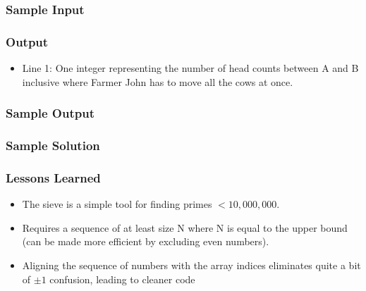 \subsubsection{Sample Input}

\subsubsection{Output}
\begin{itemize}
	\item Line 1: One integer representing the number of head counts between A and B inclusive where Farmer John has to move all the cows at once.
\end{itemize}

\subsubsection{Sample Output}

\subsubsection{Sample Solution}

\subsubsection{Lessons Learned}
\begin{itemize}
	\item The sieve is a simple tool for finding primes $<10,000,000$.
	\item Requires a sequence of at least size N where N is equal to the upper bound (can be made more efficient by excluding even numbers).
	\item Aligning the sequence of numbers with the array indices eliminates quite a bit of $\pm1$ confusion, leading to cleaner code
\end{itemize}
